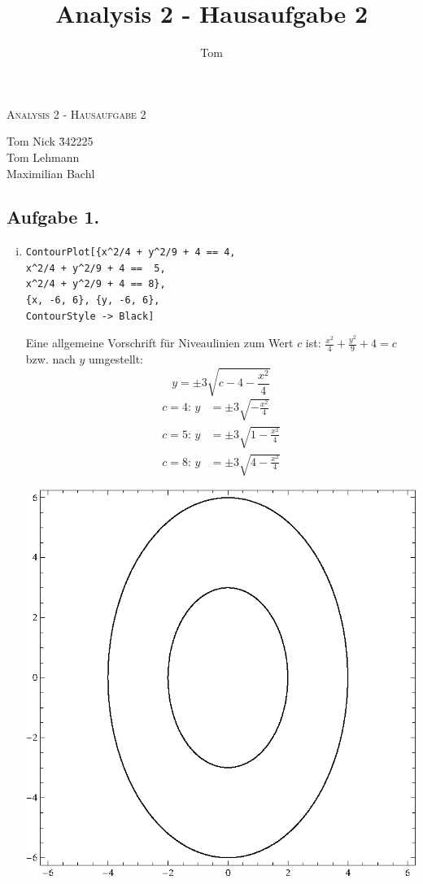\documentclass[10pt,a4paper]{scrartcl}
\author{Tom}
\title{Analysis 2 - Hausaufgabe 2}
\begin{document}
\begin{center}
\textsc{\Large{Analysis 2 - Hausaufgabe 2}} \\
\end{center}
\begin{tabbing}
Tom Nick \hspace{1.4cm}\= 342225\\
Tom Lehmann\\
Maximilian Bachl
\end{tabbing}
\subsection*{Aufgabe 1.}
\begin{enumerate}[(i)]
\item
\begin{minipage}{0.49\columnwidth}
\begin{lstlisting}[caption= Mathematica Code für die Niveaulinien von h]
ContourPlot[{x^2/4 + y^2/9 + 4 == 4, 
x^2/4 + y^2/9 + 4 ==  5, 
x^2/4 + y^2/9 + 4 == 8}, 
{x, -6, 6}, {y, -6, 6},
ContourStyle -> Black]
\end{lstlisting}
Eine allgemeine Vorschrift für Niveaulinien zum Wert $c$ ist: $\frac{x^2}{4} + \frac{y^2}{9} + 4 =c$ bzw. nach $y$ umgestellt: $$y = \pm3\sqrt{c -4 - \frac{x^2}{4}}$$
\begin{align*}
c=4\text{: } y&= \pm 3\sqrt{-\frac {x^2}4}\\
c=5\text{: } y&= \pm 3\sqrt{1-\frac{x^2}4}\\
c=8\text{: } y&= \pm 3\sqrt{4-\frac{x^2}4}
\end{align*}
\end{minipage}
\begin{minipage}{0.49\columnwidth}
\begin{center}
\includegraphics[scale=0.7]{1i.eps} 

\end{center}
\end{minipage}
\end{enumerate}
\end{document}
